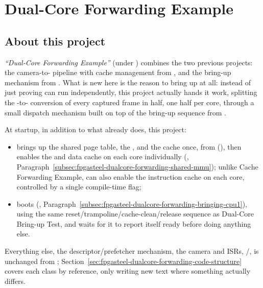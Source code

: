 \chapter{Dual-Core Forwarding Example}
\label{chap:fpgasteel-dualcore-forwarding}

\section{About this project}
\label{sec:fpgasteel-dualcore-forwarding-about}

\textit{``Dual-Core Forwarding Example''} (under ) combines the two previous projects: the camera-to- pipeline with cache management from , and the  bring-up mechanism from . What is new here is the reason to bring  up at all: instead of just proving  can run independently, this project actually hands it work, splitting the -to- conversion of every captured frame in half, one half per core, through a small dispatch mechanism built on top of the bring-up sequence from .

At startup, in addition to what  already does, this project:

\begin{itemize}
 \item brings up the shared  page table, the , and the  cache once, from  (), then enables the  and  data cache on each core individually (, Paragraph~\ref{subsec:fpgasteel-dualcore-forwarding-shared-mmu}); unlike Cache Forwarding Example,  can also enable the  instruction cache on each core, controlled by a single compile-time flag;
 \item boots  (, Paragraph~\ref{subsec:fpgasteel-dualcore-forwarding-bringing-cpu1}), using the same reset/trampoline/cache-clean/release sequence as Dual-Core Bring-up Test, and waits for it to report itself ready before doing anything else.
\end{itemize}

Everything else, the descriptor/prefetcher mechanism, the camera and  ISRs, /, is unchanged from ; Section~\ref{sec:fpgasteel-dualcore-forwarding-code-structure} covers each class by reference, only writing new text where something actually differs.

